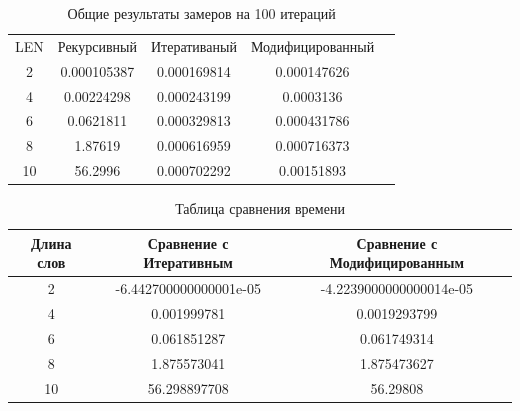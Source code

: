 \documentclass[a4paper, 14pt]{article}
\begin{document}
	\begin{table}[ht]
		\caption{Общие результаты замеров на 100 итераций}
		\label{tab:metric:1}
		\begin{tabular}{|c | c | c | c | c |}
			\hline 
			LEN	& Рекурсивный & Итеративаный & Модифицированный \\
			2 & 0.000105387 & 0.000169814 & 0.000147626 \\
			4 & 0.00224298 & 0.000243199 & 0.0003136 \\
			6 & 0.0621811 & 0.000329813 & 0.000431786 \\
			8 & 1.87619 & 0.000616959 & 0.000716373 \\
			10 & 56.2996 & 0.000702292 & 0.00151893 \\
			\hline
		\end{tabular}
	\end{table}
	
	
	
	\begin{table}
		\caption{Таблица сравнения времени}
		\label{tab:сompare:1}
		\begin{tabular}{|c|c|c|}
			Длина слов & Сравнение с Итеративным & Сравнение с Модифицированным \\
			\hline
			2 & -6.442700000000001e-05 & -4.2239000000000014e-05 \\
			4 & 0.001999781 & 0.0019293799 \\
			6 & 0.061851287 & 0.061749314\\
			8 & 1.875573041 & 1.875473627 \\
			10 & 56.298897708 & 56.29808 \\
			\hline
		\end{tabular}
	\end{table}
	
\end{document}
